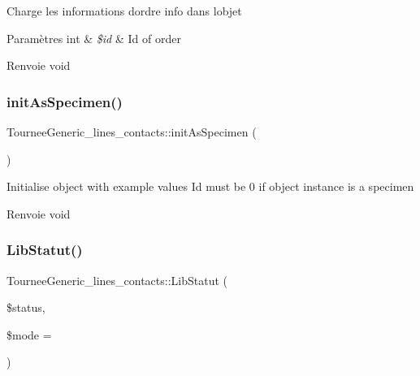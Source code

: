 Charge les informations d\textquotesingle{}ordre info dans l\textquotesingle{}objet


\begin{DoxyParams}[1]{Paramètres}
int & {\em \$id} & Id of order \\
\hline
\end{DoxyParams}
\begin{DoxyReturn}{Renvoie}
void 
\end{DoxyReturn}
\mbox{\label{classTourneeGeneric__lines__contacts_a487f8894bebdae9f5ed29478320ebfef}} 
\subsubsection{\texorpdfstring{init\+As\+Specimen()}{initAsSpecimen()}}
{\footnotesize\ttfamily Tournee\+Generic\+\_\+lines\+\_\+contacts\+::init\+As\+Specimen (\begin{DoxyParamCaption}{ }\end{DoxyParamCaption})}

Initialise object with example values Id must be 0 if object instance is a specimen

\begin{DoxyReturn}{Renvoie}
void 
\end{DoxyReturn}
\mbox{\label{classTourneeGeneric__lines__contacts_a10c4f2ff5bca7b526ac685492a5f719f}} 
\subsubsection{\texorpdfstring{Lib\+Statut()}{LibStatut()}}
{\footnotesize\ttfamily Tournee\+Generic\+\_\+lines\+\_\+contacts\+::\+Lib\+Statut (\begin{DoxyParamCaption}\item[{}]{\$status,  }\item[{}]{\$mode = {} }\end{DoxyParamCaption})}

